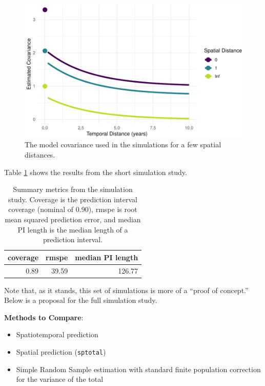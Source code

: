 \documentclass[]{interact}
\theoremstyle{plain}%
\theoremstyle{definition}
\theoremstyle{remark}
\providecommand{\tightlist}{%
  \setlength{\itemsep}{0pt}\setlength{\parskip}{0pt}}
\def\tightlist{}
\begin{document}
\begin{figure}
\centering
\includegraphics{fpspatiotemp_manu_files/figure-latex/unnamed-chunk-24-1.pdf}
\caption{\label{fig:simcovplot} The model covariance used in the
simulations for a few spatial distances.}
\end{figure}

Table \ref{simrestab} shows the results from the short simulation study.

\begin{table}[ht]
\centering
\begin{tabular}{rrr}
  \hline
coverage & rmspe & median PI length \\ 
  \hline
0.89 & 39.59 & 126.77 \\ 
   \hline
\end{tabular}
\caption{Summary metrics from the simulation study. Coverage is the prediction interval coverage (nominal of 0.90), rmspe is root mean squared prediction error, and median PI length is the median length of a prediction interval.} 
\label{simrestab}
\end{table}

Note that, as it stands, this set of simulations is more of a ``proof of
concept.'' Below is a proposal for the full simulation study.

\textbf{Methods to Compare}:

\begin{itemize}
\tightlist
\item
  Spatiotemporal prediction
\item
  Spatial prediction (\texttt{sptotal})
\item
  Simple Random Sample estimation with standard finite population
  correction for the variance of the total
\end{itemize}
\end{document}
